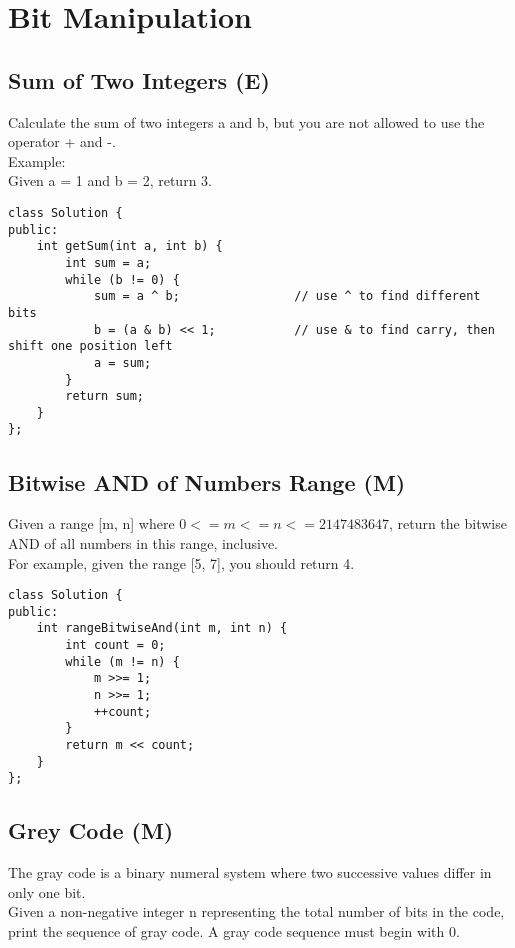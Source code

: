 \chapter{Bit Manipulation}


\section{Sum of Two Integers (E)}
Calculate the sum of two integers a and b, but you are not allowed to use the operator + and -. \\

Example:\\
Given a = 1 and b = 2, return 3. \\

\begin{lstlisting}
class Solution {
public:
    int getSum(int a, int b) {
        int sum = a;
        while (b != 0) {
            sum = a ^ b;                // use ^ to find different bits
            b = (a & b) << 1;           // use & to find carry, then shift one position left
            a = sum;
        }
        return sum;
    }
};
\end{lstlisting}


\section{Bitwise AND of Numbers Range (M)}
Given a range [m, n] where $0 <= m <= n <= 2147483647$, return the bitwise AND of all numbers in this range, inclusive.\\

For example, given the range [5, 7], you should return 4. \\

\begin{lstlisting}
class Solution {
public:
    int rangeBitwiseAnd(int m, int n) {
        int count = 0;
        while (m != n) {
            m >>= 1;
            n >>= 1;
            ++count;
        }
        return m << count;
    }
};
\end{lstlisting}


\section{Grey Code (M)}
The gray code is a binary numeral system where two successive values differ in only one bit.\\

Given a non-negative integer n representing the total number of bits in the code, print the sequence of gray code. A gray code sequence must begin with 0.\\

